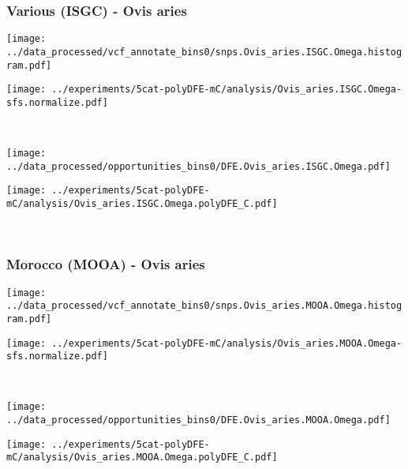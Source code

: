 \subsubsection{Various (ISGC) - Ovis aries}

\begin{minipage}{0.49\linewidth}
    \texttt{[image: ../data\_processed/vcf\_annotate\_bins0/snps.Ovis\_aries.ISGC.Omega.histogram.pdf]}
\end{minipage}
\begin{minipage}{0.49\linewidth}
    \texttt{[image: ../experiments/5cat-polyDFE-mC/analysis/Ovis\_aries.ISGC.Omega-sfs.normalize.pdf]}
\end{minipage}
\\
\begin{minipage}{0.49\linewidth}
    \texttt{[image: ../data\_processed/opportunities\_bins0/DFE.Ovis\_aries.ISGC.Omega.pdf]}
\end{minipage}
\begin{minipage}{0.49\linewidth}
    \texttt{[image: ../experiments/5cat-polyDFE-mC/analysis/Ovis\_aries.ISGC.Omega.polyDFE\_C.pdf]}
\end{minipage}
\\

\subsubsection{Morocco (MOOA) - Ovis aries}

\begin{minipage}{0.49\linewidth}
    \texttt{[image: ../data\_processed/vcf\_annotate\_bins0/snps.Ovis\_aries.MOOA.Omega.histogram.pdf]}
\end{minipage}
\begin{minipage}{0.49\linewidth}
    \texttt{[image: ../experiments/5cat-polyDFE-mC/analysis/Ovis\_aries.MOOA.Omega-sfs.normalize.pdf]}
\end{minipage}
\\
\begin{minipage}{0.49\linewidth}
    \texttt{[image: ../data\_processed/opportunities\_bins0/DFE.Ovis\_aries.MOOA.Omega.pdf]}
\end{minipage}
\begin{minipage}{0.49\linewidth}
    \texttt{[image: ../experiments/5cat-polyDFE-mC/analysis/Ovis\_aries.MOOA.Omega.polyDFE\_C.pdf]}
\end{minipage}
\\ 

